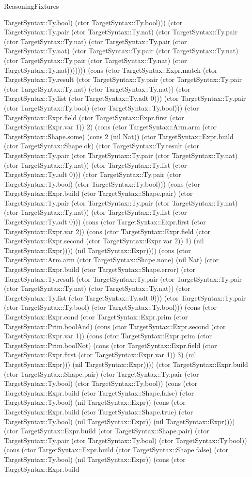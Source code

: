 \begin{lexlean}{ReasoningFixtures}
\begin{semanticmodule}
{TargetSyntax::Ty.bool) (ctor TargetSyntax::Ty.bool))) (ctor TargetSyntax::Ty.pair (ctor TargetSyntax::Ty.nat) (ctor TargetSyntax::Ty.pair (ctor TargetSyntax::Ty.nat) (ctor TargetSyntax::Ty.pair (ctor TargetSyntax::Ty.nat) (ctor TargetSyntax::Ty.pair (ctor TargetSyntax::Ty.nat) (ctor TargetSyntax::Ty.pair (ctor TargetSyntax::Ty.nat) (ctor TargetSyntax::Ty.nat))))))) (cons (ctor TargetSyntax::Expr.match (ctor TargetSyntax::Ty.result (ctor TargetSyntax::Ty.pair (ctor TargetSyntax::Ty.pair (ctor TargetSyntax::Ty.nat) (ctor TargetSyntax::Ty.nat)) (ctor TargetSyntax::Ty.list (ctor TargetSyntax::Ty.adt 0))) (ctor TargetSyntax::Ty.pair (ctor TargetSyntax::Ty.bool) (ctor TargetSyntax::Ty.bool))) (ctor TargetSyntax::Expr.field (ctor TargetSyntax::Expr.first (ctor TargetSyntax::Expr.var 1)) 2) (cons (ctor TargetSyntax::Arm.arm (ctor TargetSyntax::Shape.some) (cons 2 (nil Nat)) (ctor TargetSyntax::Expr.build (ctor TargetSyntax::Shape.ok) (ctor TargetSyntax::Ty.result (ctor TargetSyntax::Ty.pair (ctor TargetSyntax::Ty.pair (ctor TargetSyntax::Ty.nat) (ctor TargetSyntax::Ty.nat)) (ctor TargetSyntax::Ty.list (ctor TargetSyntax::Ty.adt 0))) (ctor TargetSyntax::Ty.pair (ctor TargetSyntax::Ty.bool) (ctor TargetSyntax::Ty.bool))) (cons (ctor TargetSyntax::Expr.build (ctor TargetSyntax::Shape.pair) (ctor TargetSyntax::Ty.pair (ctor TargetSyntax::Ty.pair (ctor TargetSyntax::Ty.nat) (ctor TargetSyntax::Ty.nat)) (ctor TargetSyntax::Ty.list (ctor TargetSyntax::Ty.adt 0))) (cons (ctor TargetSyntax::Expr.first (ctor TargetSyntax::Expr.var 2)) (cons (ctor TargetSyntax::Expr.field (ctor TargetSyntax::Expr.second (ctor TargetSyntax::Expr.var 2)) 1) (nil TargetSyntax::Expr)))) (nil TargetSyntax::Expr)))) (cons (ctor TargetSyntax::Arm.arm (ctor TargetSyntax::Shape.none) (nil Nat) (ctor TargetSyntax::Expr.build (ctor TargetSyntax::Shape.error) (ctor TargetSyntax::Ty.result (ctor TargetSyntax::Ty.pair (ctor TargetSyntax::Ty.pair (ctor TargetSyntax::Ty.nat) (ctor TargetSyntax::Ty.nat)) (ctor TargetSyntax::Ty.list (ctor TargetSyntax::Ty.adt 0))) (ctor TargetSyntax::Ty.pair (ctor TargetSyntax::Ty.bool) (ctor TargetSyntax::Ty.bool))) (cons (ctor TargetSyntax::Expr.cond (ctor TargetSyntax::Expr.prim (ctor TargetSyntax::Prim.boolAnd) (cons (ctor TargetSyntax::Expr.second (ctor TargetSyntax::Expr.var 1)) (cons (ctor TargetSyntax::Expr.prim (ctor TargetSyntax::Prim.boolNot) (cons (ctor TargetSyntax::Expr.field (ctor TargetSyntax::Expr.first (ctor TargetSyntax::Expr.var 1)) 3) (nil TargetSyntax::Expr))) (nil TargetSyntax::Expr)))) (ctor TargetSyntax::Expr.build (ctor TargetSyntax::Shape.pair) (ctor TargetSyntax::Ty.pair (ctor TargetSyntax::Ty.bool) (ctor TargetSyntax::Ty.bool)) (cons (ctor TargetSyntax::Expr.build (ctor TargetSyntax::Shape.false) (ctor TargetSyntax::Ty.bool) (nil TargetSyntax::Expr)) (cons (ctor TargetSyntax::Expr.build (ctor TargetSyntax::Shape.true) (ctor TargetSyntax::Ty.bool) (nil TargetSyntax::Expr)) (nil TargetSyntax::Expr)))) (ctor TargetSyntax::Expr.build (ctor TargetSyntax::Shape.pair) (ctor TargetSyntax::Ty.pair (ctor TargetSyntax::Ty.bool) (ctor TargetSyntax::Ty.bool)) (cons (ctor TargetSyntax::Expr.build (ctor TargetSyntax::Shape.false) (ctor TargetSyntax::Ty.bool) (nil TargetSyntax::Expr)) (cons (ctor TargetSyntax::Expr.build }
\end{semanticmodule}
\end{lexlean}
